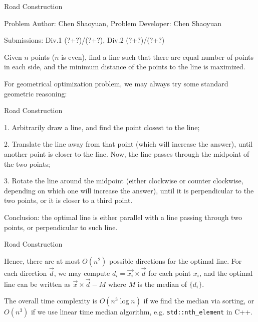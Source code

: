 \begin{Solution}{Road Construction}

\begin{frame}{\ProblemName}

\small Problem Author: Chen Shaoyuan, Problem Developer: Chen Shaoyuan \par \vspace{0.3cm}

\small Submissions: Div.1 (?+?)/(?+?), Div.2 (?+?)/(?+?)  \par \vspace{0.5cm}

Given $n$ points ($n$ is even), find a line such that there are equal number of points in each side, and the minimum distance of the points to the line is maximized.

\pause

For geometrical optimization problem, we may always try some standard geometric reasoning:

\end{frame}

\begin{frame}{Road Construction}

1. Arbitrarily draw a line, and find the point closest to the line;

\pause

2. Translate the line away from that point (which will increase the answer), until another point is closer to the line. Now, the line passes through the midpoint of the two points;

\pause

3. Rotate the line around the midpoint (either clockwise or counter clockwise, depending on which one will increase the answer), until it is perpendicular to the two points, or it is closer to a third point.

\pause 

Conclusion: the optimal line is either parallel with a line passing through two points, or perpendicular to such line.

\end{frame}

\begin{frame}{Road Construction}

Hence, there are at most $O(n^2)$ possible directions for the optimal line. For each direction $\vec{d}$, we may compute $d_i = \vec{x_i} \times \vec{d}$ for each point $x_i$, and the optimal line can be written as $\vec{x} \times \vec{d} - M$ where $M$ is the median of $\{d_i\}$.

The overall time complexity is $O(n^3 \log n)$ if we find the median via sorting, or $O(n^3)$ if we use linear time median algorithm, e.g. \texttt{std::nth\_element} in C++.

\end{frame}

\end{Solution}
